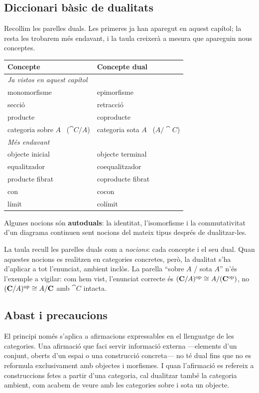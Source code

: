 \subsection{Diccionari bàsic de dualitats}

Recollim les parelles duals. Les primeres ja han aparegut en aquest capítol; la resta les trobarem més endavant, i la taula creixerà a mesura que apareguin nous conceptes.
\begin{center}
\begin{tabular}{ll}
\hline
\textbf{Concepte} & \textbf{Concepte dual}\\
\hline
\multicolumn{2}{l}{\emph{Ja vistos en aquest capítol}}\\
monomorfisme & epimorfisme\\
secció & retracció\\
producte & coproducte\\
categoria sobre $A$ \ ($\cat{C}/A$) & categoria sota $A$ \ ($A/\cat{C}$)\\
\hline
\multicolumn{2}{l}{\emph{Més endavant}}\\
objecte inicial & objecte terminal\\
equalitzador & coequalitzador\\
producte fibrat & coproducte fibrat\\
con & cocon\\
límit & colímit\\
\hline
\end{tabular}
\end{center}
Algunes nocions són \textbf{autoduals}: la identitat, l'isomorfisme i la commutativitat d'un diagrama continuen sent nocions del mateix tipus després de dualitzar-les.

La taula recull les parelles duals com a \emph{nocions}: cada concepte i el seu dual. Quan aquestes nocions es realitzen en categories concretes, però, la dualitat s'ha d'aplicar a tot l'enunciat, ambient inclòs. La parella \enquote{sobre $A$ / sota $A$} n'és l'exemple a vigilar: com hem vist, l'enunciat correcte és $(\mathbf{C}/A)^{\mathrm{op}}\cong A/(\mathbf{C}^{\mathrm{op}})$, no $(\mathbf{C}/A)^{\mathrm{op}}\cong A/\mathbf{C}$ amb $\cat{C}$ intacta.

\subsection{Abast i precaucions}

El principi només s'aplica a afirmacions expressables en el llenguatge de les categories. Una afirmació que faci servir informació externa ---elements d'un conjunt, oberts d'un espai o una construcció concreta--- no té dual fins que no es reformula exclusivament amb objectes i morfismes. I quan l'afirmació es refereix a construccions fetes a partir d'una categoria, cal dualitzar també la categoria ambient, com acabem de veure amb les categories sobre i sota un objecte.

